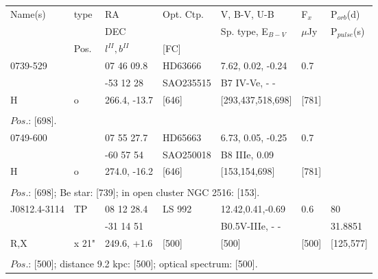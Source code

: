 \documentclass{aa}
\begin{document}
\clearpage\begin{table*}[h]
\begin{tabular}{p{2.5cm}p{1cm}p{1.8cm}p{2.3cm}p{3.3cm}p{2.0cm}p{2.2cm}}
\noalign{\smallskip}
\multicolumn{7}{p{17.5cm}}{Table 1.  (continued) }\\        
\hline
\noalign{\smallskip}
Name(s)      & type  & RA                       &  Opt. Ctp. & V, B-V, U-B                    &   F$_{x}$           & P$_{orb}$(d)    \\
                      &            &  DEC                   &                     &  Sp. type, E$_{B-V}$  &    $\mu$Jy        & P$_{pulse}$(s) \\
                      & Pos.  &  $l^{II}, b^{II}$     &  [FC]           &                                          &                            &                             \\
\noalign{\smallskip} 
\hline
\noalign{\smallskip}
 0739-529     &           & 07 46 09.8        & HD63666          & 7.62, 0.02, -0.24           &  0.7               &                   \\
                       &           & -53 12 28          & SAO235515     & B7 IV-Ve, - -                 &                       &                   \\
H                    &  o      & 266.4, -13.7      &   [646]                 &    [293,437,518,698]   &    [781]          &                    \\
\\
\multicolumn{7}{p{17.5cm}}{
$Pos$.: [698].}\\

\noalign{\smallskip}
\hline
\noalign{\smallskip}
 0749-600     &           & 07 55 27.7        & HD65663             & 6.73, 0.05, -0.25  &  0.7         &                \\
                       &           & -60 57 54          &  SAO250018       & B8 IIIe, 0.09        &                 &                \\
    H                &  o      & 274.0, -16.2      &   [646]                   &  [153,154,698]     &   [781]     &                \\
\\
\multicolumn{7}{p{17.5cm}}{
$Pos$.: [698]; Be star: [739]; in open cluster NGC 2516: [153].}\\

\noalign{\smallskip}
\hline
\noalign{\smallskip}
J0812.4-3114 &  TP    &  08 12 28.4  & LS 992      &12.42,0.41,-0.69  & 0.6          &   80            \\
                          &           & -31 14 51     &                    & B0.5V-IIIe, - -     &                 &  31.8851   \\
R,X                   & x 21" & 249.6, +1.6  &    [500]       &           [500]          &  [500]     & [125,577]  \\
\\
\multicolumn{7}{p{17.5cm}}{
$Pos$.: [500];  distance 9.2 kpc: [500]; optical spectrum: [500].   }\\


\end{tabular}
\end{table*}
\end{document}
